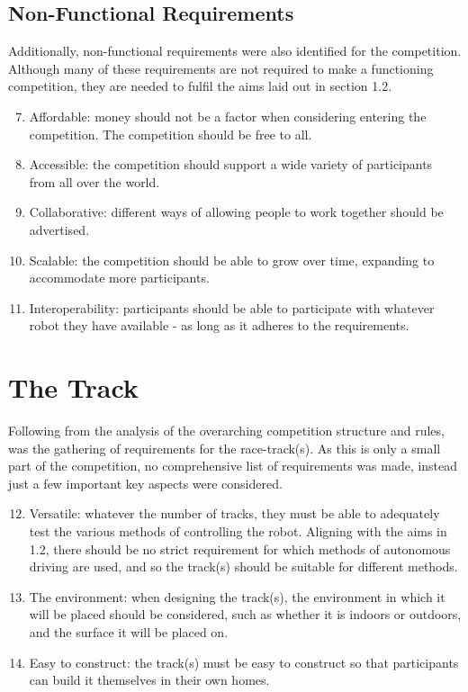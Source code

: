 \documentclass{l4proj}
\begin{document}
\subsection{Non-Functional Requirements}
Additionally, non-functional requirements were also identified for the competition. Although many of these requirements are not required to make a functioning competition, they are needed to fulfil the aims laid out in section 1.2.
\begin{enumerate}[label=A.\arabic*]
\setcounter{enumi}{6} %
    \item Affordable: money should not be a factor when considering entering the competition. The competition should be free to all.
    \item Accessible: the competition should support a wide variety of participants from all over the world.
    \item Collaborative: different ways of allowing people to work together should be advertised.
    \item Scalable: the competition should be able to grow over time, expanding to accommodate more participants.
    \item Interoperability: participants should be able to participate with whatever robot they have available - as long as it adheres to the requirements.
\end{enumerate}

\section{The Track}
Following from the analysis of the overarching competition structure and rules, was the gathering of requirements for the race-track(s). As this is only a small part of the competition, no comprehensive list of requirements was made, instead just a few important key aspects were considered.
\begin{enumerate}[label=\arabic{chapter}.\arabic*]
\setcounter{enumi}{11}
    \item Versatile: whatever the number of tracks, they must be able to adequately test the various methods of controlling the robot. Aligning with the aims in 1.2, there should be no strict requirement for which methods of autonomous driving are used, and so the track(s) should be suitable for different methods.
    \item The environment: when designing the track(s), the environment in which it will be placed should be considered, such as whether it is indoors or outdoors, and the surface it will be placed on.
    \item Easy to construct: the track(s) must be easy to construct so that participants can build it themselves in their own homes.
\end{enumerate}
\end{document}
